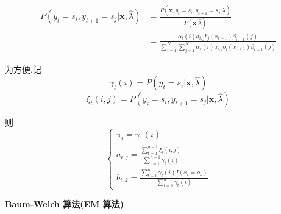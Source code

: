 \documentclass[UTF8,a4paper]{ctexart}%
\begin{document}
            \begin{equation}
              \begin{split}
              P(y_t = s_i , y_{t+1} = s_j|\bm{x},\hat{\lambda})
              &= \frac{P(\bm{x},y_t = s_i , y_{t+1} = s_j|\hat{\lambda}) }{P(\bm{x}|\hat{\lambda})} \\
              &= \frac{\alpha_t(i)a_{i,j}b_j(x_{t+1})\beta_{t+1}(j)}{ \sum_{i = 1}^N \sum_{j = 1}^N \alpha_t(i) a_{i,j} b_j(x_{t+1}) \beta_{t+1}(j)}
            \end{split}
            \end{equation}

            为方便,记
            \[\gamma_t(i) = P(y_t = s_i|\bm{x},\hat{\lambda})\]
            \[\xi_t(i,j) = P(y_t = s_i , y_{t+1} = s_j|\bm{x},\hat{\lambda})\]

            则
            \begin{equation}
              \begin{cases}
                \pi_i = \gamma_1(i)\\
                a_{i,j} = \frac{\sum_{t = 1}^{n-1} \xi_t(i,j)}{\sum_{t = 1}^{n-1} \gamma_t(i)}\\
                b_{i,k} = \frac{\sum_{t = 1}^{n} \gamma_t(i)I(x_t = o_k)}{\sum_{t = 1}^{n} \gamma_t(i)}
              \end{cases}
            \end{equation}

            \textbf{Baum-Welch 算法(EM 算法)}
\end{document}
